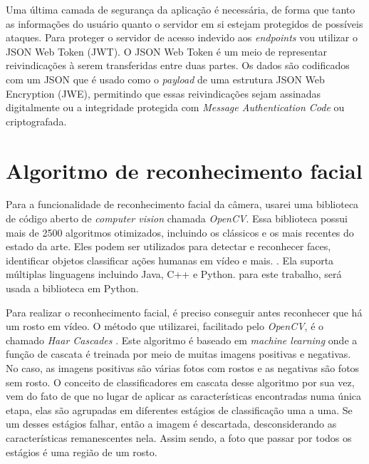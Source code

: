 \documentclass[12pt, %
openright, 
oneside, %
a4paper,    %
brazil]{facom-ufu-abntex2}
\begin{document}
Uma última camada de segurança da aplicação é necessária, de forma que tanto as
informações do usuário quanto o servidor em si estejam protegidos de possíveis
ataques. Para proteger o servidor de acesso indevido aos \emph{endpoints} vou
utilizar o JSON Web Token (JWT). O JSON Web Token é um meio de representar
reivindicações à serem transferidas entre duas partes. Os dados são codificados
com um JSON que é usado como o \emph{payload} de uma estrutura JSON Web
Encryption (JWE), permitindo que essas reivindicações sejam assinadas
digitalmente ou a integridade protegida com \emph{Message Authentication Code}
ou criptografada. \cite{jsonwebtoken}

\section{Algoritmo de reconhecimento facial}

Para a funcionalidade de reconhecimento facial da câmera, usarei uma biblioteca
de código aberto de \emph{computer vision} chamada \emph{OpenCV}. Essa
biblioteca possui mais de 2500 algoritmos otimizados, incluindo os clássicos e
os mais recentes do estado da arte. Eles podem ser utilizados para detectar e
reconhecer faces, identificar objetos classificar ações humanas em vídeo e
mais. \cite{opencv}. Ela suporta múltiplas linguagens incluindo Java, C++ e
Python. para este trabalho, será usada a biblioteca em Python.

Para realizar o reconhecimento facial, é preciso conseguir antes reconhecer que
há um rosto em vídeo. O método que utilizarei, facilitado pelo \emph{OpenCV}, é
o chamado \emph{Haar Cascades} \cite{viola2001rapid}. Este algoritmo é baseado
em \emph{machine learning} onde a função de cascata é treinada por meio de
muitas imagens positivas e negativas. No caso, as imagens positivas são várias
fotos com rostos e as negativas são fotos sem rosto. O conceito de
classificadores em cascata desse algoritmo por sua vez, vem do fato de que no
lugar de aplicar as características encontradas numa única etapa, elas são
agrupadas em diferentes estágios de classificação uma a uma. Se um desses
estágios falhar, então a imagem é descartada, desconsiderando as
características remanescentes nela. Assim sendo, a foto que passar por todos os
estágios é uma região de um rosto.
\end{document}
